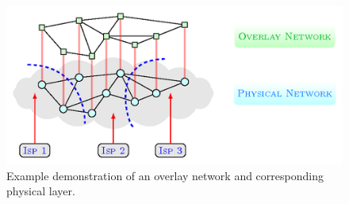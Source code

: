\begin{figure}[!h]
\centering
\includegraphics[scale=3.0]{img/p2p-topology.png}
\caption{Example demonstration of an overlay network and corresponding physical layer.}
\label{fig:overlay-underlay}
\end{figure}



